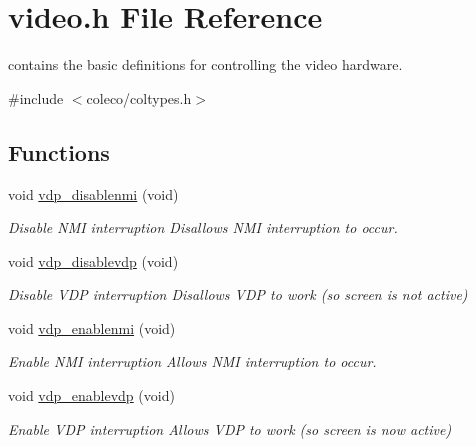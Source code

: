 \hypertarget{a00053}{}\section{video.\+h File Reference}
\label{a00053}


contains the basic definitions for controlling the video hardware.  


{\ttfamily \#include $<$coleco/coltypes.\+h$>$}\newline
\subsection*{Functions}
\begin{DoxyCompactItemize}
\item 
\mbox{\label{a00053_a556fbfbc86f53ebce1cd33b75508a30b}} 
void \hyperlink{a00053_a556fbfbc86f53ebce1cd33b75508a30b}{vdp\+\_\+disablenmi} (void)
\begin{DoxyCompactList}\small\item\em Disable N\+MI interruption Disallows N\+MI interruption to occur. \end{DoxyCompactList}\item 
\mbox{\label{a00053_a52fcf46fb1e68b8fcc6f1f7c8eba5e72}} 
void \hyperlink{a00053_a52fcf46fb1e68b8fcc6f1f7c8eba5e72}{vdp\+\_\+disablevdp} (void)
\begin{DoxyCompactList}\small\item\em Disable V\+DP interruption Disallows V\+DP to work (so screen is not active) \end{DoxyCompactList}\item 
\mbox{\label{a00053_acfc547ddc2c924a276f1ee0351751102}} 
void \hyperlink{a00053_acfc547ddc2c924a276f1ee0351751102}{vdp\+\_\+enablenmi} (void)
\begin{DoxyCompactList}\small\item\em Enable N\+MI interruption Allows N\+MI interruption to occur. \end{DoxyCompactList}\item 
\mbox{\label{a00053_a79f55e5785e18e189852d14a78f7da64}} 
void \hyperlink{a00053_a79f55e5785e18e189852d14a78f7da64}{vdp\+\_\+enablevdp} (void)
\begin{DoxyCompactList}\small\item\em Enable V\+DP interruption Allows V\+DP to work (so screen is now active) \end{DoxyCompactList}\item 

\end{DoxyCompactItemize}
